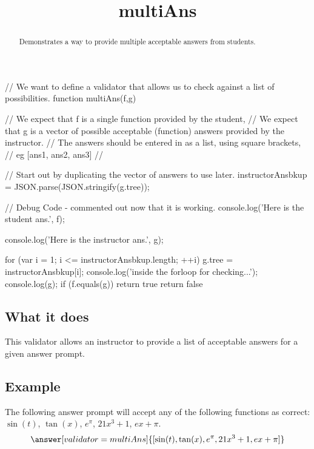 \documentclass{ximera}
\title{multiAns}
\begin{document}
\begin{abstract}
    Demonstrates a way to provide multiple acceptable answers from students.
\end{abstract}
\maketitle

\begin{javascript}
// We want to define a validator that allows us to check against a list of possibilities.
function multiAns(f,g) {
    // We expect that f is a single function provided by the student,
    // We expect that g is a vector of possible acceptable (function) answers provided by the instructor.
    //      The answers should be entered in as a list, using square brackets,
    //      eg [ans1, ans2, ans3]
    //
    
    // Start out by duplicating the vector of answers to use later.
    instructorAnsbkup = JSON.parse(JSON.stringify(g.tree));
    
     //   Debug Code - commented out now that it is working.
    console.log('Here is the student ans.', f);
    
    console.log('Here is the instructor ans.', g);
    
    
    for (var i = 1; i <= instructorAnsbkup.length; ++i) {
        g.tree = instructorAnsbkup[i];
        console.log('inside the forloop for checking...');
        console.log(g);
        if (f.equals(g)){
            return true
        }
    }
return false
}
  
\end{javascript}

\subsection*{What it does}
    This validator allows an instructor to provide a list of acceptable answers for a given answer prompt.


\subsection*{Example}
    \begin{problem}
        The following answer prompt will accept any of the following functions as correct: $\sin(t)$, $\tan(x)$, $e^\pi$, $21x^3 + 1$, $ex + \pi$.
        \[
            \answer[validator=multiAns]{[\sin(t),\tan(x),e^\pi,21x^3 + 1,ex + \pi]}
        \]
    \end{problem}
\end{document}
